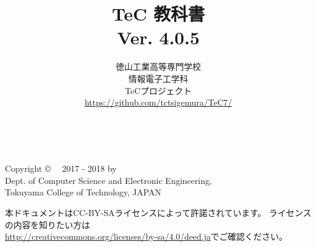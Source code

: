 \documentclass[a4paper,twocolumn,twoside,dvipdfmx]{jsbook}
\begin{document}
\frontmatter
\title{TeC 教科書\\Ver. 4.0.5}
\author{徳山工業高等専門学校\\情報電子工学科\\TeCプロジェクト\\
\url{https://github.com/tctsigemura/TeC7/}}
\date{}
\maketitle

\thispagestyle{empty}
\onecolumn
~
\vfill
\begin{flushleft}
Copyright \copyright ~~ 2017 - 2018 by \\
Dept. of Computer Science and Electronic Engineering, \\
Tokuyama College of Technology, JAPAN
\end{flushleft}

\vspace{0.8cm}
本ドキュメントはCC-BY-SAライセンスによって許諾されています。
ライセンスの内容を知りたい方は\\
\url{http://creativecommons.org/licenses/by-sa/4.0/deed.ja}でご確認ください。

\setcounter{tocdepth}{2}
\tableofcontents

\twocolumn
\mainmatter

\appendix

\backmatter
\pagestyle{empty}
\onecolumn
~
\vfill\vfill\vfill
\begin{center}
\end{center}
\vfill
\end{document}
